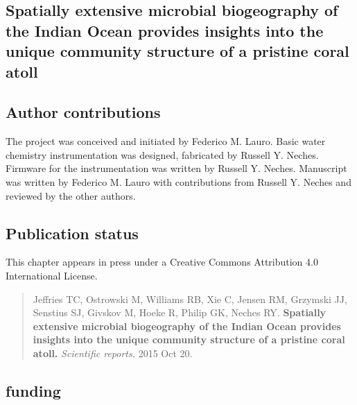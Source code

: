 \begin{refsection}

\chapter{Spatially extensive microbial biogeography of the Indian Ocean provides insights into the unique community structure of a pristine coral atoll}


\section{Author contributions}

The project was conceived and initiated by Federico M. Lauro. Basic
water chemistry instrumentation was designed, fabricated by Russell Y.
Neches. Firmware for the instrumentation was written by Russell Y.
Neches. Manuscript was written by Federico M. Lauro with contributions
from Russell Y. Neches and reviewed by the other authors.

\section{Publication status}

This chapter appears in press under a Creative Commons Attribution 4.0 International License.

\begin{quote}
Jeffries TC, Ostrowski M, Williams RB, Xie C, Jensen RM, Grzymski JJ,
Senstius SJ, Givskov M, Hoeke R, Philip GK, Neches RY. {\bf Spatially
extensive microbial biogeography of the Indian Ocean provides insights
into the unique community structure of a pristine coral atoll.}
{\em Scientific reports.} 2015 Oct 20.
\end{quote}







\section{funding}


\end{refsection}
